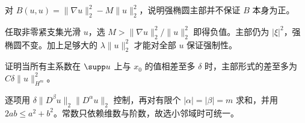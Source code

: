 \begin{exercise}[为什么要减去低阶项]\label{ex:y6-garding-shift}
对 $B(u,u)=\|\nabla u\|_2^2-M\|u\|_2^2$，说明强椭圆主部并不保证 $B$ 本身为正。
\end{exercise}
\begin{solution}
任取非零紧支集光滑 $u$，选 $M>\|\nabla u\|_2^2/\|u\|_2^2$ 即得负值。主部仍为 $|\xi|^2$，强椭圆不变。加上足够大的 $\lambda\|u\|_2^2$ 才能对全部 $u$ 保证强制性。
\end{solution}

\begin{exercise}[冻结系数误差]\label{ex:y6-freezing}
证明当所有主系数在 $\supp u$ 上与 $x_0$ 的值相差至多 $\delta$ 时，主部形式的差至多为 $C\delta\|u\|_{H^m}^2$。
\end{exercise}
\begin{solution}
逐项用 $\delta\|D^\beta u\|_2\|D^\alpha u\|_2$ 控制，再对有限个 $|\alpha|=|\beta|=m$ 求和，并用 $2ab\le a^2+b^2$。常数只依赖维数与阶数，故选小邻域时可统一。
\end{solution}
